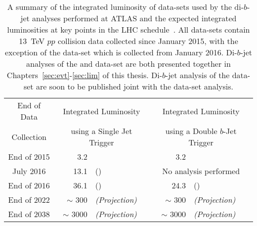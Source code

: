 {\renewcommand{\arraystretch}{1.2}
\begin{table}[!htb]
\centering
\begin{tabular}{|c|r l|r l|}
  \hline
End of Data             & \multicolumn{2}{c|}{Integrated Luminosity}         &  \multicolumn{2}{c|}{Integrated Luminosity}  \\
Collection     &  \multicolumn{2}{c|}{using a Single Jet Trigger}   &  \multicolumn{2}{c|}{using a Double $b$-Jet Trigger} \\
\hline
End of 2015             &  3.2 \ifb{} & \cite{dibjet-mori16_paper}                              & 3.2 \ifb{} & \cite{dibjet-lhcp_conf}                      \\
July  2016              & 13.1 \ifb{} & \cite{dibjet-ichep_conf} (\summer{})                    & \multicolumn{2}{c|}{No analysis performed}                   \\
End of 2016             & 36.1 \ifb{} & (\hm{})                              & 24.3 \ifb{} & (\lm{})              \\
End of 2022             & $\sim$ 300 \ifb{} &  \textit{(Projection)}          & $\sim$ 300  \ifb{} &  \textit{(Projection)}     \\
End of 2038             & $\sim$ 3000 \ifb{} & \textit{(Projection)}          & $\sim$ 3000 \ifb{} &  \textit{(Projection)}    \\
\hline
\end{tabular}
\caption[A summary of the integrated luminosity of data-sets used by the di-$b$-jet analyses performed at ATLAS and the expected integrated luminosities at key points in the LHC schedule]
        {A summary of the integrated luminosity of data-sets used by the di-$b$-jet analyses performed at ATLAS and the expected integrated luminosities at key points in the LHC schedule~\cite{fut-lhc-shedule}.
          All data-sets contain 13~TeV $pp$ collision data collected since January 2015,
          with the exception of the \lm{} data-set which is collected from January 2016.
          Di-$b$-jet analyses of the \summer{} and \lm{} data-set are both presented together in Chapters~\ref{sec:evt}-\ref{sec:lim} of this thesis.
          Di-$b$-jet analysis of the \hm{} data-set are soon to be published joint with the \lm{} data-set analysis.
        }
\label{tab:fut-lumi}
\end{table}}

